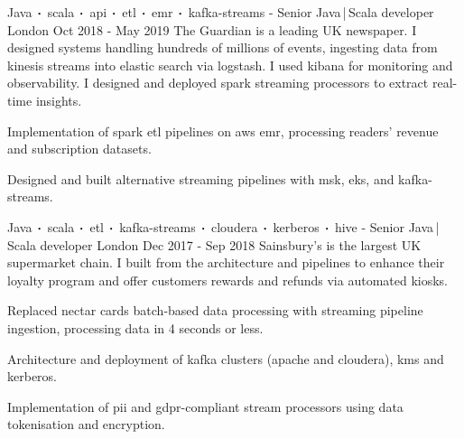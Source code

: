 \begin{cventries}
    \cventry
    {Java$\sqbig$scala$\sqbig$api$\sqbig$etl$\sqbig$emr$\sqbig$kafka-streams}
    { - Senior Java\,|\,Scala developer}
    {London}
    {Oct 2018 - May 2019}
    {The Guardian is a leading UK newspaper. I designed systems handling hundreds of millions of events, ingesting data from kinesis streams into elastic search via logstash. I used kibana for monitoring and observability. I designed and deployed spark streaming processors to extract real-time insights.}
    {
        \begin{cvitems}
            \item{Implementation of spark etl pipelines on aws emr, processing readers' revenue and subscription datasets.}
            \item{Designed and built alternative streaming pipelines with msk, eks, and kafka-streams.}
        \end{cvitems}
    }

    \cventry
    {Java$\sqbig$scala$\sqbig$etl$\sqbig$kafka-streams$\sqbig$cloudera$\sqbig$kerberos$\sqbig$hive}
    { - Senior Java\,|\,Scala developer}
    {London}
    {Dec 2017 - Sep 2018}
    {Sainsbury's is the largest UK supermarket chain. I built from the architecture and pipelines to enhance their loyalty program and offer customers rewards and refunds via automated kiosks.}
    {
        \begin{cvitems}
            \item{Replaced nectar cards batch-based data processing with streaming pipeline ingestion, processing data in 4 seconds or less.}
            \item{Architecture and deployment of kafka clusters (apache and cloudera), kms and kerberos.}
            \item{Implementation of pii and gdpr-compliant stream processors using data tokenisation and encryption.}
        \end{cvitems}
    }


\end{cventries}
